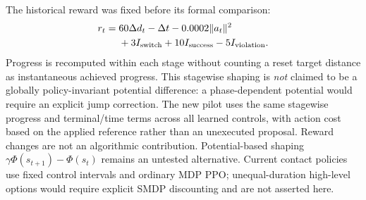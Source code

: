 The historical reward was fixed before its formal comparison:
\begin{equation}
\begin{split}
 r_t={}&60\Delta d_t-\Delta t-0.0002\|a_t\|^2\\
       &+3I_{\rm switch}+10I_{\rm success}-5I_{\rm violation}.
\end{split}
\end{equation}
Progress is recomputed within each stage without counting a reset target distance as instantaneous achieved progress. This stagewise shaping is \emph{not} claimed to be a globally policy-invariant potential difference: a phase-dependent potential would require an explicit jump correction. The new pilot uses the same stagewise progress and terminal/time terms across all learned controls, with action cost based on the applied reference rather than an unexecuted proposal. Reward changes are not an algorithmic contribution. Potential-based shaping $\gamma\Phi(s_{t+1})-\Phi(s_t)$ remains an untested alternative. Current contact policies use fixed control intervals and ordinary MDP PPO; unequal-duration high-level options would require explicit SMDP discounting and are not asserted here.
